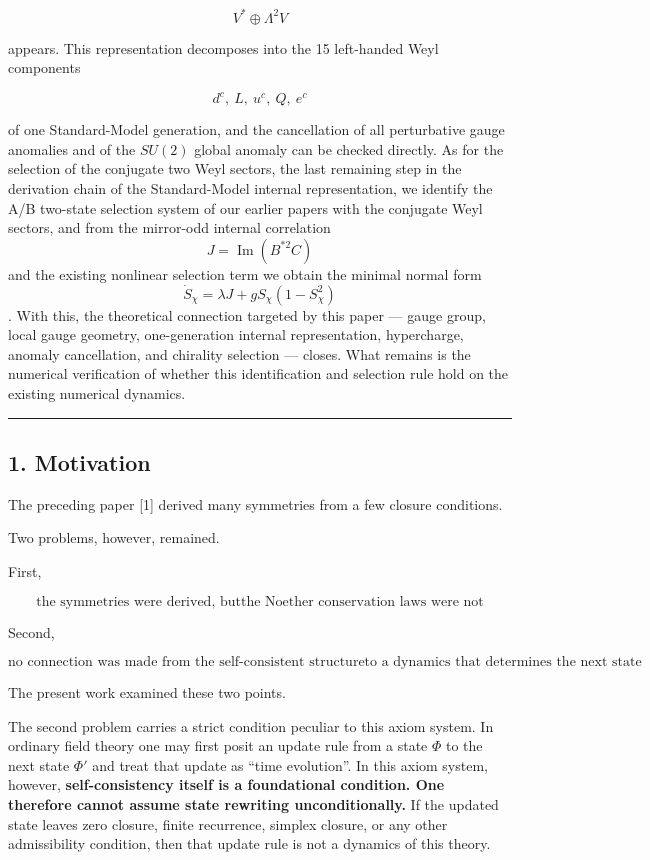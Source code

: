 \documentclass[
  a4paper,
]{article}
\begin{document}
\[
V^*\oplus\Lambda^2V
\]

appears. This representation decomposes into the 15 left-handed Weyl
components

\[
d^c,\ L,\ u^c,\ Q,\ e^c
\]

of one Standard-Model generation, and the cancellation of all
perturbative gauge anomalies and of the \(SU(2)\) global anomaly can be
checked directly. As for the selection of the conjugate two Weyl
sectors, the last remaining step in the derivation chain of the
Standard-Model internal representation, we identify the A/B two-state
selection system of our earlier papers with the conjugate Weyl sectors,
and from the mirror-odd internal correlation \[
J=\operatorname{Im}(B^{*2}C)
\] and the existing nonlinear selection term we obtain the minimal
normal form \[
\dot S_\chi=\lambda J+gS_\chi(1-S_\chi^2)
\] . With this, the theoretical connection targeted by this paper ---
gauge group, local gauge geometry, one-generation internal
representation, hypercharge, anomaly cancellation, and chirality
selection --- closes. What remains is the numerical verification of
whether this identification and selection rule hold on the existing
numerical dynamics.

\begin{center}\rule{0.5\linewidth}{0.5pt}\end{center}

\subsection{1. Motivation}\label{motivation}

The preceding paper {[}1{]} derived many symmetries from a few closure
conditions.

Two problems, however, remained.

First,

\[
\boxed{
\text{the symmetries were derived, but}
\text{the Noether conservation laws were not}
}
\]

Second,

\[
\boxed{
\text{no connection was made from the self-consistent structure}
\text{to a dynamics that determines the next state}
}
\]

The present work examined these two points.

The second problem carries a strict condition peculiar to this axiom
system. In ordinary field theory one may first posit an update rule from
a state \(\Phi\) to the next state \(\Phi'\) and treat that update as
``time evolution''. In this axiom system, however,
\textbf{self-consistency itself is a foundational condition. One
therefore cannot assume state rewriting unconditionally.} If the updated
state leaves zero closure, finite recurrence, simplex closure, or any
other admissibility condition, then that update rule is not a dynamics
of this theory.
\end{document}
